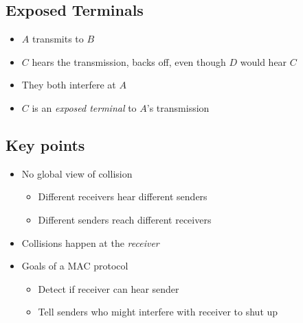 \subsection{Exposed Terminals}
\begin{figure}[H]
\end{figure}
\begin{itemize}[nosep]
    \item $A$ transmits to $B$
    \item $C$ hears the transmission, backs off, even though $D$ would hear $C$
    \item They both interfere at $A$
    \item $C$ is an \emph{exposed terminal} to $A$'s transmission
\end{itemize}

\subsection{Key points}
\begin{itemize}[nosep]
    \item No global view of collision
          \begin{itemize}[nosep]
              \item Different receivers hear different senders
              \item Different senders reach different receivers
          \end{itemize}
    \item Collisions happen at the \emph{receiver}
    \item Goals of a MAC protocol
          \begin{itemize}[nosep]
              \item Detect if receiver can hear sender
              \item Tell senders who might interfere with receiver to shut up
          \end{itemize}
\end{itemize}

